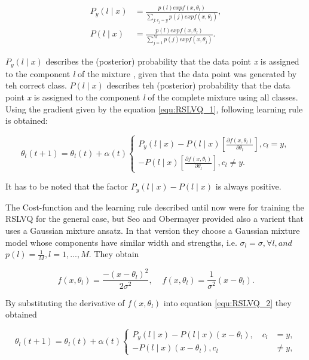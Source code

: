 \documentclass[12pt,oneside,a4paper,parskip]{scrbook}
\begin{document}
\begin{equation}
  \begin{split}
    P_y(l\mid x) &= \frac{p(l) exp f(x, \theta_l)}{\displaystyle\sum_{j:c_j = y}p(j) exp f(x, \theta_j)}, \\
    P(l\mid x) &= \frac{p(l) exp f(x, \theta_l)}{\displaystyle\sum_{j=1}^{M}p(j) exp f(x, \theta_j)}.
  \end{split}
\end{equation}

$P_y(l\mid x)$ describes the (posterior) probability that the data point \textit{x} is assigned to the component \textit{l} of the mixture
, given that the data point was generated by teh correct class. $P(l\mid x)$ describes teh (posterior) probability that the 
data point \textit{x} is assigned to the component \textit{l} of the complete mixture using all classes.
Using the gradient given by the equation \ref{equ:RSLVQ_1}, following learning rule is obtained: 

\begin{equation}
  \theta_l(t + 1) = \theta_l(t) + \alpha(t) 
  \begin{cases}
    P_y(l\mid x) - P(l\mid x)[\frac{\partial f(x, \theta_l) }{\partial\theta_l}], c_l = y,  \\
    - P(l\mid x)[\frac{\partial f(x, \theta_l) }{\partial\theta_l}],              c_l \neq y.              
  \end{cases}
  \label{equ:RSLVQ_2}
\end{equation}

It has to be noted that the factor $P_y(l\mid x) - P(l\mid x)$ is always positive. \cite{RSLVQOrig}

The Cost-function and the learning rule described until now were for training the RSLVQ for the general case, but 
Seo and Obermayer provided also a varient that uses a Gaussian mixture ansatz.
In that version they choose a Gaussian mixture model whose components have similar width and strengths, i.e.
$\sigma_l = \sigma, \forall l, and$ $p(l) = \frac{1}{M}, l = 1, ..., M$. They obtain 

\begin{equation}
  f(x,\theta_l) = \frac{-(x-\theta_l)^2}{2\sigma^2},   \quad   \frac{}{}f(x,\theta_l) = \frac{1}{\sigma^2}(x-\theta_l).
\end{equation}

By substituting the derivative of $f(x,\theta_l)$ into equation \ref{equ:RSLVQ_2} they obtained

\begin{equation}
  \theta_l(t + 1) = \theta_l(t) + \alpha(t) 
  \begin{cases}
    P_y(l\mid x) - P(l\mid x)(x-\theta_l), \quad c_l &= y,  \\
    - P(l\mid x)(x-\theta_l),               c_l &\neq y,              
  \end{cases}
  \label{equ:RSLVQ_3}
\end{equation}
\end{document}
